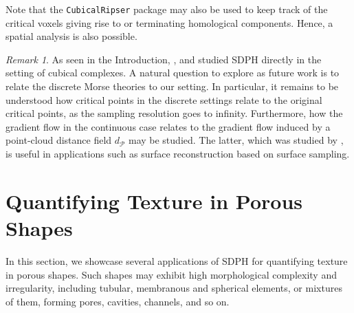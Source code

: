 \documentclass[11pt]{article}
\theoremstyle{plain}
\theoremstyle{definition}
\theoremstyle{remark}
\newtheorem{rmk}{Remark}
\begin{document}
	Note that the \texttt{CubicalRipser} \citep{kaji_cubical_2020} package may also be used to keep track of the critical voxels giving rise to or terminating homological components. Hence, a spatial analysis is also possible.
	
	\begin{rmk}
		As seen in the Introduction, \cite{delgado-friedrichs_skeletonization_2015}, \cite{herring_topological_2019} and \cite{moon_statistical_2019} studied SDPH directly in the setting of cubical complexes. A natural question to explore as future work is to relate the discrete Morse theories \citep{banchoff_critical_1967,forman_morse_1998, bauer_persistence_2011, lewiner_critical_2013, bloch_polyhedral_2013, saucan_discrete_2020} to our setting. In particular, it remains to be understood how critical points in the discrete settings relate to the original critical points, as the sampling resolution goes to infinity. Furthermore, how the gradient flow in the continuous case 
		relates to the gradient flow induced by a point-cloud distance field $d_\mathcal{P}$ may be studied. The latter, which was studied by \cite{giesen_medial_2006, giesen_flow_2008, giesen_parallel_2013}, is useful in applications such as surface reconstruction based on surface sampling.
	\end{rmk}
	
	\section{Quantifying Texture in Porous Shapes}
	\label{sec:quantifying_texture_applis}
	
	In this section, we showcase several applications of SDPH for quantifying texture in porous shapes. Such shapes may exhibit high morphological complexity and irregularity, including tubular, membranous and spherical elements, or mixtures of them, forming pores, cavities, channels, and so on.
	
\end{document}
